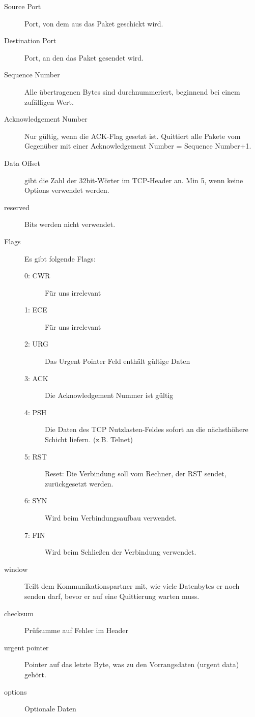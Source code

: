 \documentclass[a4paper,10pt]{scrartcl}
\begin{document}
    \begin{description}
    \item[Source Port] Port, von dem aus das Paket geschickt wird.
    \item[Destination Port] Port, an den das Paket gesendet wird.
    \item[Sequence Number] Alle übertragenen Bytes sind durchnummeriert, beginnend bei einem zufälligen Wert.
    \item[Acknowledgement Number] Nur gültig, wenn die ACK-Flag gesetzt ist. Quittiert alle Pakete vom Gegenüber mit einer Acknowledgement Number = Sequence Number+1.
    \item[Data Offset] gibt die Zahl der 32bit-Wörter im TCP-Header an. Min 5, wenn keine Options verwendet werden.
    \item[reserved] Bits werden nicht verwendet.
    \item[Flags] Es gibt folgende Flags:
    \begin{description}
        \item[0: CWR] Für uns irrelevant
        \item[1: ECE] Für uns irrelevant
        \item[2: URG] Das Urgent Pointer Feld enthält gültige Daten
        \item[3: ACK] Die Acknowledgement Nummer ist gültig
        \item[4: PSH] Die Daten des TCP Nutzlasten-Feldes sofort an die nächsthöhere Schicht liefern. (z.B. Telnet)
        \item[5: RST] Reset: Die Verbindung soll vom Rechner, der RST sendet, zurückgesetzt werden.
        \item[6: SYN] Wird beim Verbindungsaufbau verwendet.
        \item[7: FIN] Wird beim Schließen der Verbindung verwendet.
    \end{description}
    \item[window] Teilt dem Kommunikationspartner mit, wie viele Datenbytes er noch senden darf, bevor er auf eine Quittierung warten muss.
    \item[checksum] Prüfsumme auf Fehler im Header
    \item[urgent pointer] Pointer auf das letzte Byte, was zu den Vorrangsdaten (urgent data) gehört.
    \item[options] Optionale Daten %
    \end{description}
\end{document}
